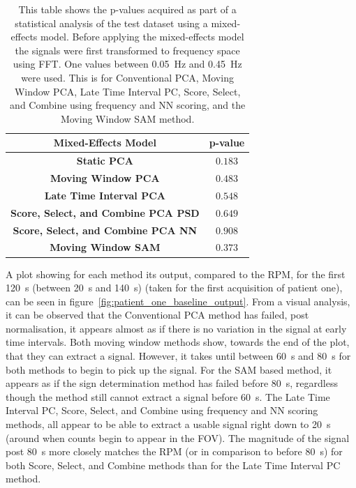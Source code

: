     \begin{table}
        \centering
        
        \captionsetup{singlelinecheck=false}
        \caption{This table shows the p-values acquired as part of a statistical analysis of the test dataset using a mixed-effects model. Before applying the mixed-effects model the signals were first transformed to frequency space using \gls{FFT}. One values between \SI{0.05}{\hertz} and \SI{0.45}{\hertz} were used. This is for Conventional \gls{PCA}, Moving Window \gls{PCA}, Late Time Interval \gls{PC}, Score, Select, and Combine using frequency and \gls{NN} scoring, and the Moving Window \gls{SAM} method.}
        
        \begin{tabular}{||c||c||}
            \hline
            \textbf{Mixed-Effects Model}                & \textbf{p-value} \\
            \hline
            \hline
            \textbf{Static PCA}                         & $0.183$ \\
            \hline
            \textbf{Moving Window PCA}                  & $0.483$ \\
            \hline
            \textbf{Late Time Interval PCA}             & $0.548$ \\
            \hline
            \textbf{Score, Select, and Combine PCA PSD} & $0.649$ \\
            \hline
            \textbf{Score, Select, and Combine PCA NN}  & $0.908$ \\
            \hline
            \textbf{Moving Window SAM}                  & $0.373$ \\
            \hline
        \end{tabular}
        \label{tab:statistical_analysis}
    \end{table}
    
    A plot showing for each method its output, compared to the \gls{RPM}, for the first \SI{120}{\second} (between \SI{20}{\second} and \SI{140}{\second}) (taken for the first acquisition of patient one), can be seen in figure~\ref{fig:patient_one_baseline_output}. From a visual analysis, it can be observed that the Conventional \gls{PCA} method has failed, post normalisation, it appears almost as if there is no variation in the signal at early time intervals. Both moving window methods show, towards the end of the plot, that they can extract a signal. However, it takes until between \SI{60}{\second} and \SI{80}{\second} for both methods to begin to pick up the signal. For the \gls{SAM} based method, it appears as if the sign determination method has failed before \SI{80}{\second}, regardless though the method still cannot extract a signal before \SI{60}{\second}. The Late Time Interval \gls{PC}, Score, Select, and Combine using frequency and \gls{NN} scoring methods, all appear to be able to extract a usable signal right down to \SI{20}{\second} (around when counts begin to appear in the \gls{FOV}). The magnitude of the signal post \SI{80}{\second} more closely matches the \gls{RPM} (or in comparison to before \SI{80}{\second}) for both Score, Select, and Combine methods than for the Late Time Interval \gls{PC} method.
    
